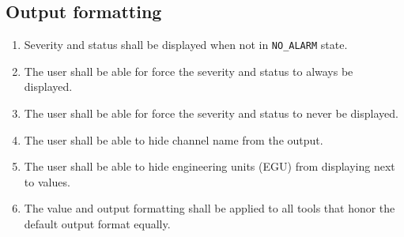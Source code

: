 \documentclass[12pt,a4paper]{article}
\begin{document}
\subsection{Output formatting}
\begin{enumerate}
	\item Severity and status shall be displayed when not in \texttt{NO\_ALARM} state.
	\item The user shall be able for force the severity and status to always be displayed.
	\item The user shall be able for force the severity and status to never be displayed.
	\item The user shall be able to hide channel name from the output.
	\item The user shall be able to hide engineering units (EGU) from displaying next to values.
	\item The value and output formatting shall be applied to all tools that honor the default output format equally.
\end{enumerate}



\end{document}
